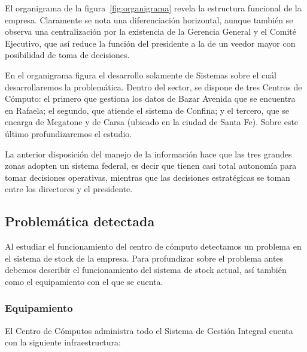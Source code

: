 El organigrama de la figura~\ref{fig:organigrama} revela la estructura
funcional de la empresa.  Claramente se nota una diferenciación horizontal,
aunque también se observa una centralización  por la existencia de la Gerencia
General y el Comité Ejecutivo, que así reduce la función del presidente a la de
un veedor mayor con posibilidad de toma de decisiones.

En el organigrama figura el desarrollo solamente de Sistemas sobre el cuál
desarrollaremos la problemática. Dentro del sector, se dispone de tres Centros
de Cómputo: el primero que gestiona los datos de Bazar Avenida que se encuentra
en Rafaela; el segundo, que atiende el sistema de Confina; y el tercero, que se
encarga de Megatone y de Carsa (ubicado en la ciudad de Santa Fe). Sobre este
último profundizaremos el estudio.

La anterior disposición del manejo de la información hace que las tres grandes
zonas adopten un sistema federal, es decir que tienen casi total autonomía para
tomar decisiones operativas, mientras que las decisiones estratégicas se toman
entre los directores y el presidente.


\subsection{Problemática detectada}

Al estudiar el funcionamiento del centro de cómputo detectamos un problema en
el sistema de stock de la empresa. Para profundizar sobre el problema antes
debemos describir el funcionamiento del sistema de stock actual, así también
como el equipamiento con el que se cuenta.


\subsubsection{Equipamiento}

El Centro de Cómputos administra todo el Sistema de Gestión Integral cuenta con
la siguiente infraestructura:

